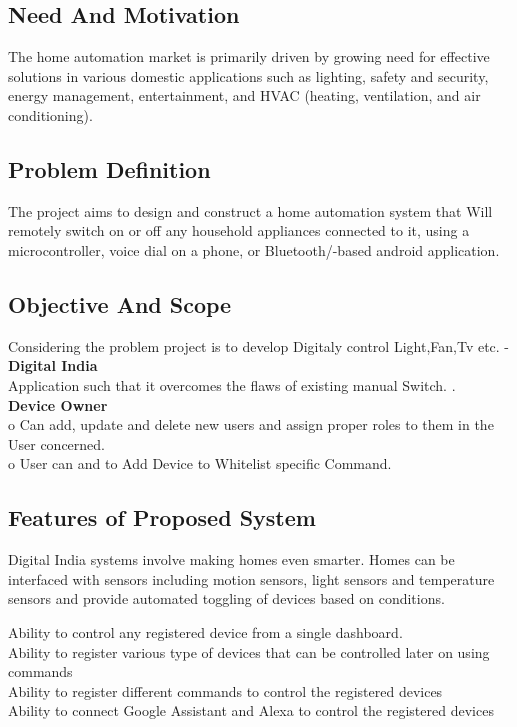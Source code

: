 \subsection{Need And Motivation}


\textbullet \hspace{0.2cm}The home automation market is primarily driven by growing need for effective solutions
in various domestic applications such as lighting, safety and security, energy
management, entertainment, and HVAC (heating, ventilation, and air conditioning).


\subsection{Problem Definition }
The project aims to design and construct a home automation system that Will remotely switch on or off any household appliances connected to it, using a microcontroller, voice dial on a phone, or Bluetooth/-based android application.

\subsection{Objective And Scope}
Considering the problem project is to develop Digitaly control Light,Fan,Tv etc. -  \textbf{Digital India}\\Application such that it overcomes the flaws of existing manual Switch. 
	 .\\
\textbullet \hspace{0.2cm}	\textbf{Device Owner}\\
o	Can add, update and delete new users and assign proper roles to them in the User concerned.  \\
o	User can  and to Add Device to Whitelist specific Command.\\


\subsection{Features of Proposed System}
Digital India systems involve making homes even smarter. Homes can be interfaced with sensors including motion sensors, light sensors and temperature sensors and provide
automated toggling of devices based on conditions.

\textbullet \hspace{0.2cm}Ability to control any registered device from a single dashboard.\\
\textbullet \hspace{0.2cm} Ability to register various type of devices that can be controlled later on using
commands \\
\textbullet \hspace{0.2cm}Ability to register different commands to control the registered devices \\
\textbullet \hspace{0.2cm} Ability to connect Google Assistant and Alexa to control the registered devices


